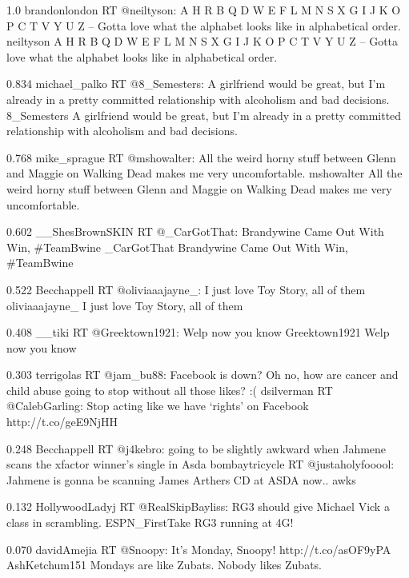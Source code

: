{1.0}
{\joinNameTweet
{brandonlondon}
{RT @neiltyson: A H R B Q D W E F L M N S X G I J K O P C T V Y U Z -- Gotta love what the alphabet looks like in alphabetical order.}}
{\joinNameTweet
{neiltyson}
{A H R B Q D W E F L M N S X G I J K O P C T V Y U Z -- Gotta love what the alphabet looks like in alphabetical order.}}

{0.834}
{\joinNameTweet
{michael\_palko}
{RT @8\_Semesters: A girlfriend would be great, but I'm already in a pretty committed relationship with alcoholism and bad decisions.}}
{\joinNameTweet
{8\_Semesters}
{A girlfriend would be great, but I'm already in a pretty committed relationship with alcoholism and bad decisions.}}

{0.768}
{\joinNameTweet
{mike\_sprague}
{RT @mshowalter: All the weird horny stuff between Glenn and Maggie on Walking Dead makes me very uncomfortable.}}
{\joinNameTweet
{mshowalter}
{All the weird horny stuff between Glenn and Maggie on Walking Dead makes me very uncomfortable.}}

{0.602}
{\joinNameTweet
{\_\_ShesBrownSKIN}
{RT @\_CarGotThat: Brandywine Came Out With Win, \#TeamBwine}}
{\joinNameTweet
{\_CarGotThat}
{Brandywine Came Out With Win, \#TeamBwine}}

{0.522}
{\joinNameTweet
{Becchappell}
{RT @oliviaaajayne\_: I just love Toy Story, all of them}}
{\joinNameTweet
{oliviaaajayne\_}
{I just love Toy Story, all of them}}

{0.408}
{\joinNameTweet
{\_\_tiki}
{RT @Greektown1921: Welp now you know}}
{\joinNameTweet
{Greektown1921}
{Welp now you know}}

{0.303}
{\joinNameTweet
{terrigolas}
{RT @jam\_bu88: Facebook is down? Oh no, how are cancer and child abuse going to stop without all those likes? :(}}
{\joinNameTweet
{dsilverman}
{RT @CalebGarling: Stop acting like we have ‘rights' on Facebook http://t.co/geE9NjHH}}

{0.248}
{\joinNameTweet
{Becchappell}
{RT @j4kebro: going to be slightly awkward when Jahmene scans the xfactor winner's single in Asda}}
{\joinNameTweet
{bombaytricycle}
{RT @justaholyfooool: Jahmene is gonna be scanning James Arthers CD at ASDA now.. awks}}

{0.132}
{\joinNameTweet
{HollywoodLadyj}
{RT @RealSkipBayliss: RG3 should give Michael Vick a class in scrambling.}}
{\joinNameTweet
{ESPN\_FirstTake}
{RG3 running at 4G!}}

{0.070}
{\joinNameTweet
{davidAmejia}
{RT @Snoopy: It's Monday, Snoopy! http://t.co/asOF9yPA}}
{\joinNameTweet
{AshKetchum151}
{Mondays are like Zubats. Nobody likes Zubats.}}
